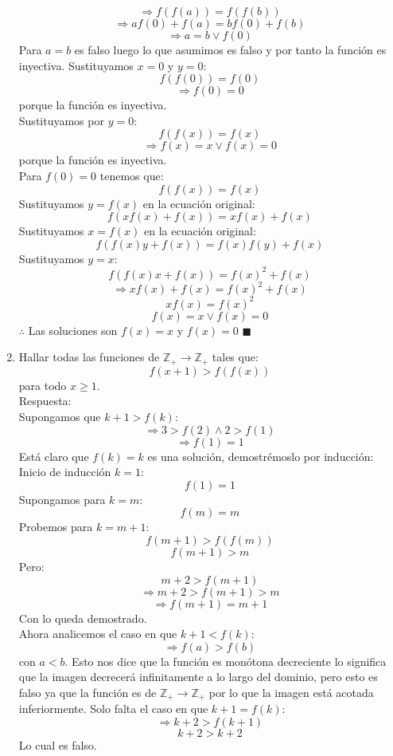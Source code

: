 \documentclass{book}
\newcommand{\Z}{\mathbb{Z}} \def\max{\mathop{\mbox{\rm máx}}} %
\begin{document}
\begin{enumerate}
          $$\Rightarrow f( f(a))=f( f(b))$$
          $$\Rightarrow af(0)+ f(a)=bf(0)+ f(b)$$
          $$\Rightarrow a=b \vee f(0)$$
          Para $a=b$ es falso luego lo que asumimos es falso y por tanto la función es inyectiva.
          Sustituyamos $x=0$ y $y=0$:
          $$f( f(0)) = f(0)$$
          $$\Rightarrow f(0)=0$$
          porque la función es inyectiva.\\
          Sustituyamos por $y=0$:
          $$f( f(x))= f(x)$$
          $$\Rightarrow f(x)=x \vee f(x)=0$$
          porque la función es inyectiva.\\
          Para $f(0)=0$ tenemos que:
          $$f( f(x)) = f(x)$$
          Sustituyamos $y=f(x)$ en la ecuación original:
          $$f(xf(x)+f(x))=xf(x)+f(x)$$
          Sustituyamos $x=f(x)$ en la ecuación original:
          $$f(f(x)y+f(x))=f(x)f(y)+f(x)$$
          Sustituyamos $y=x$:
          $$f(f(x)x+f(x))=f(x)^2+f(x)$$
          $$\Rightarrow xf(x)+f(x)=f(x)^2+f(x)$$
          $$xf(x)=f(x)^2$$
          $$f(x)=x\vee f(x)=0$$
          $\therefore$ Las soluciones son $f(x)=x$ y $f(x)=0$ $\blacksquare$\\
    \item Hallar todas las funciones de $\Z_+\rightarrow\Z_+$ tales que:
          $$f(x+1)>f(f(x))$$
          para todo $x\geq1$.\\
          Respuesta:\\
          Supongamos que $k+1>f(k)$:
          $$\Rightarrow 3> f(2) \wedge 2>f(1)$$
          $$\Rightarrow f(1)=1$$
          Está claro que $f(k)=k$ es una solución, demostrémoslo por inducción:\\
          Inicio de inducción $k=1$:
          $$f(1)=1$$
          Supongamos para $k=m$:
          $$f(m)=m$$
          Probemos para $k=m+1$:
          $$f(m+1)>f(f(m))$$
          $$f(m+1)>m$$
          Pero:
          $$m+2>f(m+1)$$
          $$\Rightarrow m+2>f(m+1)>m$$
          $$\Rightarrow f(m+1)=m+1$$
          Con lo queda demostrado.\\
          Ahora analicemos el caso en que $k+1<f(k)$:
          $$\Rightarrow f(a)>f(b)$$
          con $a<b$. Esto nos dice que la función es monótona decreciente lo significa que la imagen decrecerá infinitamente a lo largo del dominio, pero esto es falso ya que la función es de $\Z_+\rightarrow \Z_+$ por lo que la imagen está acotada inferiormente.
          Solo falta el caso en que $k+1=f(k)$:
          $$\Rightarrow k+2>f(k+1)$$
          $$k+2>k+2$$
          Lo cual es falso.\\

\end{enumerate}
\end{document}
